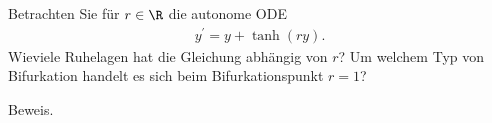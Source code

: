 \begin{exercise}
Betrachten Sie für $r \in \R$ die autonome ODE
\begin{align*}
  y^{\prime} = y + \tanh(ry).
\end{align*}
Wieviele Ruhelagen hat die Gleichung abhängig von $r$? Um welchem Typ von Bifurkation
handelt es sich beim Bifurkationspunkt $r = 1$?
\end{exercise}
\begin{solution}
Beweis.
\end{solution}
